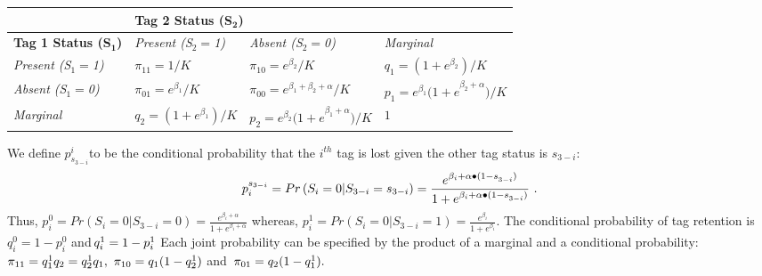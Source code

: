 \documentclass{article}
\begin{document}
\begin{table}[htbp]
\begin{center}
\begin{tabular}{|l|p{112pt}|p{130pt}|p{135pt}|}
\hline
& 
\multicolumn{2}{|p{243pt}|}{\textbf{Tag 2 Status (S}$_{\mathrm{\mathbf{2}}}$\textbf{)}} & 
 \\
\hline
\textbf{Tag 1 Status (S}$_{\mathrm{\mathbf{1}}}$\textbf{)}& 
\textit{Present (S}$_{2}=$\textit{1)}& 
\textit{Absent (S}$_{2}=$\textit{0)}& 
\textit{Marginal} \\
\hline
\textit{Present (S}$_{1}=$\textit{1)}& 
$\pi_{11}=1/K$& 
$\pi_{10}=e^{\beta_{2}}/K$& 
$q_{1}=(1+e^{\beta_{2}})/K$ \\
\hline
\textit{Absent (S}$_{1}=$\textit{0)}& 
$\pi_{01}=e^{\beta_{1}}/K$& 
${\pi_{00}=e}^{\beta_{1}+\beta_{2}+\alpha }/K$& 
${{p_{1}=e}^{\beta_{1}}(1+e}^{\beta_{2}+\alpha })/K$ \\
\hline
\textit{Marginal}& 
$q_{2}=(1+e^{\beta_{1}})/K$& 
${{p_{2}=e}^{\beta_{2}}(1+e}^{\beta_{1}+\alpha })/K$& 
$1$ \\
\hline
\end{tabular}
\label{tab3}
\end{center}
\end{table}

We define $p_{s_{3-i}}^{i}$to be the conditional probability that the 
$i^{th}$ tag is lost given the other tag status is $s_{3-i}$:
\[
p_{i}^{s_{3-i}}=Pr\left( S_{i}=0\vert S_{3-i}=s_{3-i} \right)=\frac{e^{\beta 
_{i}+\alpha {\bullet (1-s}_{3-i})}}{1+e^{\beta_{i}+\alpha {\bullet 
(1-s}_{3-i})}}\thinspace \thinspace .
\]
Thus, $p_{i}^{0}=Pr\left( S_{i}=0\vert S_{3-i}=0 \right)=\frac{e^{\beta 
_{i}+\alpha }}{1+e^{\beta_{i}+\alpha }}$ whereas, $p_{i}^{1}=Pr\left( 
S_{i}=0\vert S_{3-i}=1 \right)=\frac{e^{\beta_{i}}}{1+e^{\beta_{i}}}$. The 
conditional probability of tag retention is $q_{i}^{0}=1-p_{i}^{0}$ 
and$\thinspace q_{i}^{1}=1-p_{i}^{1}$ Each joint probability can be 
specified by the product of a marginal and a conditional probability: $\pi 
_{11}=q_{1}^{1}q_{2}=q_{2}^{1}q_{1},\thinspace \thinspace \pi 
_{10}=q_{1}(1-q_{2}^{1})$ and $\thinspace \pi_{01}=q_{2}(1-q_{1}^{1}).$
\end{document}
